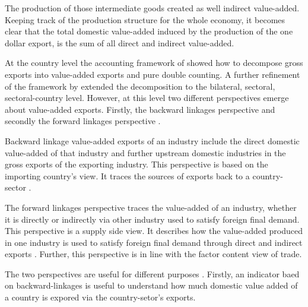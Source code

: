 The production of those intermediate goods created as well indirect value-added.
Keeping track of the production structure for the whole economy, it becomes clear that
  the total domestic value-added induced by the production of the one dollar export, is the sum of all direct and indirect value-added.
     \par
  At the country level the accounting framework of \textcite{Koopman} showed how to decompose gross exports into value-added exports and pure double counting.
   A further refinement of the framework by \textcite{wang2013} extended the decomposition to the bilateral, sectoral, sectoral-country level.
However, at this level two different perspectives emerge about value-added exports.
   Firstly, the backward linkages perspective and secondly the forward linkages perspective \textcite{wang2013}. \par
 Backward linkage value-added exports of an industry include the direct domestic value-added of that industry and further upstream domestic industries in the gross exports of the exporting industry.
 This perspective is based on the importing country's view.
  It traces the sources of exports back to a country-sector \textcite{wang2013}. \par
  The forward linkages perspective  traces the value-added of an industry, whether it is directly or indirectly via other industry used to satisfy foreign final demand.
  This perspective is a supply side view.
  It describes how the value-added produced in one industry is used to satisfy foreign final demand through direct and indirect exports \textcite{wang2013}.
  Further, this perspective is in line with the factor content view of trade.
\par
The two perspectives are useful for different purposes \textcite{wang2013}.
Firstly, an indicator baed on backward-linkages is useful to understand how much domestic value added of a country is expored via the country-setor's exports.

